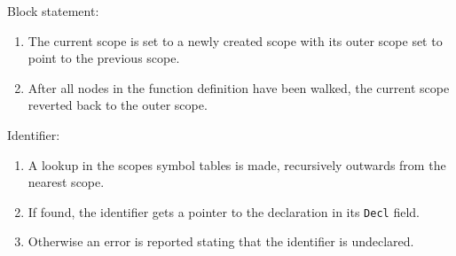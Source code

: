 Block statement:
\begin{enumerate}
	\item The current scope is set to a newly created scope with its outer scope set to point to the previous scope.
	\item After all nodes in the function definition have been walked, the current scope reverted back to the outer scope.
\end{enumerate}

Identifier:
\begin{enumerate}
	\item A lookup in the scopes symbol tables is made, recursively outwards from the nearest scope.
	\item If found, the identifier gets a pointer to the declaration in its \texttt{Decl} field.
	\item Otherwise an error is reported stating that the identifier is undeclared.
\end{enumerate}
